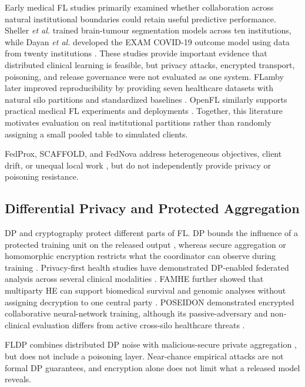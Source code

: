 \documentclass[conference]{IEEEtran}
\begin{document}
Early medical FL studies primarily examined whether collaboration across natural
institutional boundaries could retain useful predictive performance. Sheller
\emph{et al.} trained brain-tumour segmentation models across ten institutions,
while Dayan \emph{et al.} developed the EXAM COVID-19 outcome model using data
from twenty institutions \cite{sheller2020federated,dayan2021federated}. These
studies provide important evidence that distributed clinical learning is
feasible, but privacy attacks, encrypted transport, poisoning, and release
governance were not evaluated as one system. FLamby later improved
reproducibility by providing seven healthcare datasets with natural silo
partitions and standardized baselines \cite{ogier2022flamby}. OpenFL similarly
supports practical medical FL experiments and deployments
\cite{foley2022openfl}. Together, this literature motivates evaluation on real
institutional partitions rather than randomly assigning a small pooled table to
simulated clients.

FedProx, SCAFFOLD, and FedNova address heterogeneous objectives, client drift,
or unequal local work \cite{li2020fedprox,karimireddy2020scaffold,wang2020fednova},
but do not independently provide privacy or poisoning resistance.

\subsection{Differential Privacy and Protected Aggregation}

DP and cryptography protect different parts of FL. DP bounds the influence of a
protected training unit on the released output
\cite{dwork2006calibrating,abadi2016deep}, whereas secure aggregation or
homomorphic encryption restricts what the coordinator can observe during
training \cite{bonawitz2017practical,cheon2017homomorphic}. Privacy-first health
studies have demonstrated DP-enabled federated analysis across several clinical
modalities \cite{sadilek2021privacy}. FAMHE further showed that multiparty HE can
support biomedical survival and genomic analyses without assigning decryption
to one central party \cite{froelicher2021famh}. POSEIDON demonstrated encrypted
collaborative neural-network training, although its passive-adversary and
non-clinical evaluation differs from active cross-silo healthcare threats
\cite{sav2021poseidon}.

FLDP combines distributed DP noise with malicious-secure private aggregation
\cite{stevens2022fldp}, but does not include a poisoning layer. Near-chance
empirical attacks are not formal DP guarantees, and encryption alone does not
limit what a released model reveals.
\end{document}
